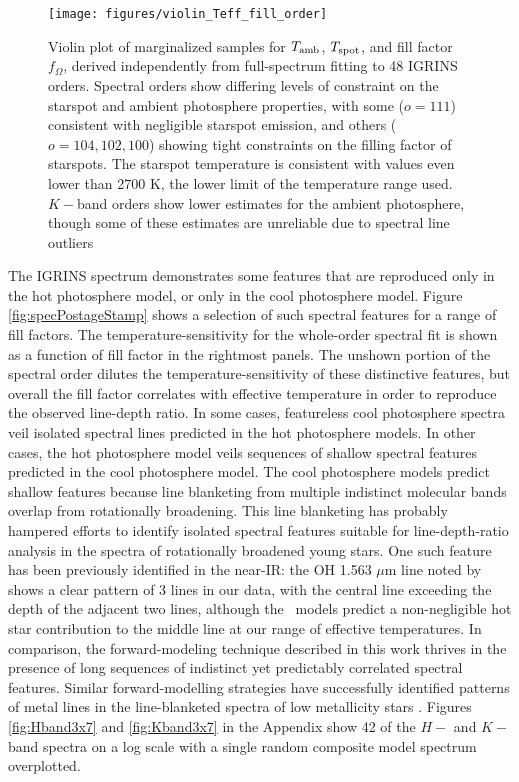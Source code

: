 \documentclass[12pt]{report}
\begin{document}
\begin{figure*}
 \centering
 \texttt{[image: figures/violin\_Teff\_fill\_order]} 
 \caption[Results of two-temperature mixture model from 48 IGRINS orders]{Violin plot of marginalized samples for $T_\textrm{amb}$, $T_\textrm{spot}$, and fill factor $f_{\Omega}$, derived independently from full-spectrum fitting to 48 IGRINS orders.  Spectral orders show differing levels of constraint on the starspot and ambient photosphere properties, with some ($o=111$) consistent with negligible starspot emission, and others ($o=104, 102, 100$) showing tight constraints on the filling factor of starspots.  The starspot temperature is consistent with values even lower than 2700 K, the lower limit of the temperature range used.  $K-$band orders show lower estimates for the ambient photosphere, though some of these estimates are unreliable due to spectral line outliers}
 \label{fig:TwoTempResults}
\end{figure*}

The IGRINS spectrum demonstrates some features that are reproduced only in the hot photosphere model, or only in the cool photosphere model.  Figure \ref{fig:specPostageStamp} shows a selection of such spectral features for a range of fill factors.  The temperature-sensitivity for the whole-order spectral fit is shown as a function of fill factor in the rightmost panels.  The unshown portion of the spectral order dilutes the temperature-sensitivity of these distinctive features, but overall the fill factor correlates with effective temperature in order to reproduce the observed line-depth ratio.  In some cases, featureless cool photosphere spectra veil isolated spectral lines predicted in the hot photosphere models.  In other cases, the hot photosphere model veils sequences of shallow spectral features predicted in the cool photosphere model.  The cool photosphere models predict shallow features because line blanketing from multiple indistinct molecular bands overlap from rotationally broadening.  This line blanketing has probably hampered efforts to identify isolated spectral features suitable for line-depth-ratio analysis in the spectra of rotationally broadened young stars.  One such feature has been previously identified in the near-IR: the OH 1.563 $\mu$m line noted by \citet{oneal01} shows a clear pattern of 3 lines in our data, with the central line exceeding the depth of the adjacent two lines, although the \PHOENIX\ models predict a non-negligible hot star contribution to the middle line at our range of effective temperatures.  In comparison, the forward-modeling technique described in this work thrives in the presence of long sequences of indistinct yet predictably correlated spectral features.  Similar forward-modelling strategies have successfully identified patterns of metal lines in the line-blanketed spectra of low metallicity stars \citep{kirby11,kirby15}.  Figures \ref{fig:Hband3x7} and \ref{fig:Kband3x7} in the Appendix show 42 of the $H-$ and $K-$band spectra on a log scale with a single random composite model spectrum overplotted.  
\end{document}
